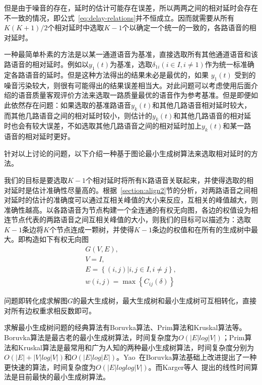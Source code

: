 但是由于噪音的存在，延时的估计可能存在误差，所以两两之间的相对延时会存在不一致的情况，即公式~\ref{eq:delay-relations}并不恒成立。因而就需要从所有$K(K+1)/2$个相对延时中选取$K-1$个以确定一个统一的一致的，各路语音的相对延时。

一种最简单朴素的方法是以某一通道语音为基准，直接选取所有其他通道语音和该路语音的相对延时。例如以$y_1 (t)$为基准，选取$\delta_{1i}  (i \in I, i \neq 1)$作为统一标准确定各路语音的延时。但是这种方法得出的结果未必是最优的，如果 $y_1 (t)$ 受到的噪音污染较大，则很有可能得出的结果误差相当大。对此问题可以考虑使用后面介绍的语音质量客观评价方法来选取一路质量最优的语音作为参考基准。但是即便如此依然存在问题：如果选取的基准路语音$y_k (t)$和其他几路语音相对延时较大，而其他几路语音之间的相对延时较小，则估计的$y_k (t)$和其他几路语音的相对延时也会有较大误差，不如选取其他几路语音之间的相对延时加上$y_k (t)$和某一路语音的相对延时更好。

针对以上讨论的问题，以下介绍一种基于图论最小生成树算法来选取相对延时的方法。

我们的目标是要选取$K-1$个相对延时将所有K路语音关联起来，并使得选取的相对延时是估计准确性尽量高的。根据~\ref{section:align2}节的分析，对两路语音之间相对延时的估计的准确度可以通过互相关峰值的大小来反应，互相关的峰值越大，则准确性越高。以各路语音为节点构建一个全连通的有权无向图，各边的权值设为相连节点代表的两路语音之间互相关峰值的大小，则我们的目标可以描述为：选取$K-1$条边将$K$个节点连成一颗树，并使得$K-1$条边的权值和在所有的生成树中最大。即构造如下有权无向图
\begin{equation}
\begin{array}{l}
G(V,E), \\
V = I, \\
E = \left\{(i,j)|i, j\in I, i \neq j\right\}, \\
w(i,j)=\max⁡ \left\{ C_{ij}(\delta) \right\}
\end{array}
\end{equation}

问题即转化成求解图$G$的最大生成树，最大生成树和最小生成树可互相转化，直接对所有边权重求相反数即可。

求解最小生成树问题的经典算法有Boruvka算法、Prim算法和Kruskal算法等。Boruvka算法是最古老的最小生成树算法，时间复杂度为$O(|E|log|V|)$；Prim算法和Kruskal算法是最常用和广为人知的两种最小生成树算法，时间复杂度分别为$O(|E|+|V|log|V|)$和$O(|E|log|E|)$。Yao~\cite{YAO197521}在Boruvka算法基础上改进提出了一种更快速的算法，时间复杂度为$O(|E|loglog|V|)$。而Karger等人~\cite{Karger:1995:RLA:201019.201022}提出的线性时间算法是目前最快的最小生成树算法。

